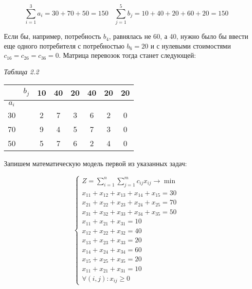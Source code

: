 \documentclass[a4paper,12pt]{article}
\begin{document}
	\[
		 \sum\limits_{i=1}^3 a_{i} = 30 + 70 + 50 = 150 \ \ \ \
		 \sum\limits_{j=1}^5 b_{j} = 10 + 40 + 20 + 60 + 20 = 150 
	\]
	
	Если бы, например, потребность $b_4$, равнялась не 60, а 40, нужно было бы ввести еще одного потребителя с потребностью $b_6 = 20$ и с нулевыми стоимостями $c_{16} = c_{26} = c_{36} = 0$. Матрица перевозок тогда станет следующей:
	
	\begin{flushright}
		\textit{Таблица 2.2}
	\end{flushright}
	\begin{center}
		\begin{tabular}{c|ccccccc}
			\cline{2-8}
			& \multicolumn{1}{c|}{$b_j$} & \multicolumn{1}{c|}{10} & \multicolumn{1}{c|}{40} & \multicolumn{1}{c|}{20} & \multicolumn{1}{c|}{40} & \multicolumn{1}{c|}{20} & \multicolumn{1}{l|}{20} \\ \hline
			\multicolumn{1}{|c|}{$a_i$} &  &  &  &  &  &  & \multicolumn{1}{l}{} \\ \cline{1-1} \cline{3-8} 
			\multicolumn{1}{|c|}{30} & \multicolumn{1}{c|}{} & \multicolumn{1}{c|}{2} & \multicolumn{1}{c|}{7} & \multicolumn{1}{c|}{3} & \multicolumn{1}{c|}{6} & \multicolumn{1}{c|}{2} & \multicolumn{1}{c|}{0} \\ \cline{1-1} \cline{3-8} 
			\multicolumn{1}{|c|}{70} & \multicolumn{1}{c|}{} & \multicolumn{1}{c|}{9} & \multicolumn{1}{c|}{4} & \multicolumn{1}{c|}{5} & \multicolumn{1}{c|}{7} & \multicolumn{1}{c|}{3} & \multicolumn{1}{c|}{0} \\ \cline{1-1} \cline{3-8} 
			\multicolumn{1}{|c|}{50} & \multicolumn{1}{c|}{} & \multicolumn{1}{c|}{5} & \multicolumn{1}{c|}{7} & \multicolumn{1}{c|}{6} & \multicolumn{1}{c|}{2} & \multicolumn{1}{c|}{4} & \multicolumn{1}{c|}{0} \\ \cline{1-1} \cline{3-8} 
		\end{tabular}
	\end{center}

	Запишем математическую модель первой из указанных задач:
	
	\begin{equation}
		\begin{cases}
			Z = \sum\limits_{i=1}^n \sum\limits_{j=1}^m c_{ij}x_{ij} \longrightarrow \min \\
			x_{11} + x_{12} + x_{13} + x_{14} + x_{15} = 30\\
			x_{21} + x_{22} + x_{23} + x_{24} + x_{25} = 70\\
			x_{31} + x_{32} + x_{33} + x_{34} + x_{35} = 50\\
			x_{11} + x_{21} + x_{31} = 10\\
			x_{12} + x_{22} + x_{32} = 40\\
			x_{13} + x_{23} + x_{33} = 20\\
			x_{14} + x_{24} + x_{34} = 60\\
			x_{15} + x_{25} + x_{35} = 20\\
			x_{11} + x_{21} + x_{31} = 10\\ 
			\forall (i,j): x_{ij} \geqslant 0
		\end{cases}
	\end{equation}
	\newpage
	
\end{document}
